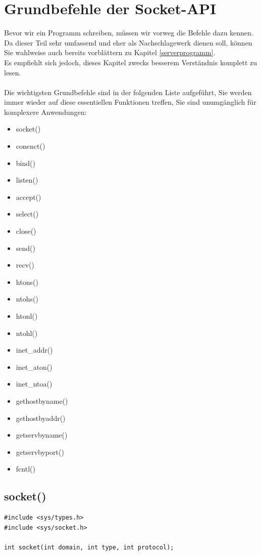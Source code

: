 \documentclass[b5paper,10pt,dvips,fleqn,titlepage,twoside]{book}
\begin{document}
\section{Grundbefehle der Socket-API}
Bevor wir ein Programm schreiben, müssen wir vorweg die Befehle dazu kennen. Da dieser Teil sehr umfassend  und eher als Nachschlagewerk dienen soll, können Sie wahlweise auch bereits vorblättern zu Kapitel \ref{serverprogramm}.\\
Es empfiehlt sich jedoch, dieses Kapitel zwecks besserem Verständnis komplett zu lesen.
\\\\
Die wichtigsten Grundbefehle sind in der folgenden Liste aufgeführt, Sie werden immer wieder auf diese essentiellen Funktionen treffen, Sie sind unumgänglich für komplexere Anwendungen:
\begin{itemize}
 \item socket()
\item conenct()
\item bind()
\item listen()
\item accept()
\item select()
\item close()
\item send()
\item recv()
\item htons()
\item ntohs()
\item htonl()
\item ntohl()
\item inet\_addr()
\item inet\_aton()
\item inet\_ntoa()
\item gethostbyname()
\item gethostbyaddr()
\item getservbyname()
\item getservbyport()
\item fcntl()
\end{itemize}

\subsection{socket()}
\begin{verbatim}
#include <sys/types.h>
#include <sys/socket.h>

int socket(int domain, int type, int protocol);
\end{verbatim}
\end{document}
